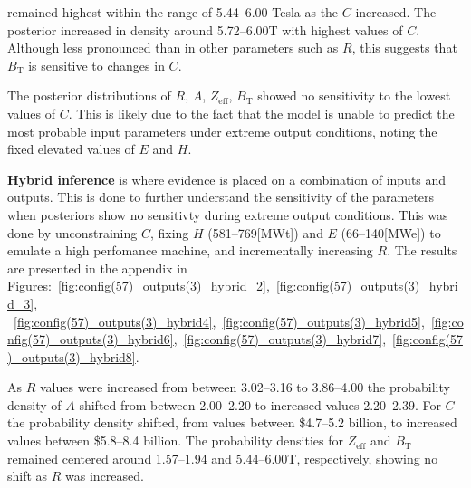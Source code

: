 \documentclass[journal]{IEEEtran}
\begin{document}
 remained highest within the range of 5.44--6.00 Tesla as the $C$ increased. The posterior increased in density around 5.72--6.00T with highest values of $C$. Although less pronounced than in other parameters such as $R$, this suggests that $B_{\text{T}}$ is sensitive to changes in $C$.

The posterior distributions of $R$, $A$, $Z_{\text{eff}}$, $B_{\text{T}}$ showed no sensitivity to the lowest values of $C$. This is likely due to the fact that the model is unable to predict the most probable input parameters under extreme output conditions, noting the fixed elevated values of $E$ and $H$. 

\textbf{Hybrid inference} is where evidence is placed on a combination of inputs and outputs. This is done to further understand the sensitivity of the  parameters when posteriors show no sensitivty during extreme output conditions. This was done by unconstraining $C$, fixing $H$ (581--769[MWt]) and $E$ (66--140[MWe]) to emulate a high perfomance machine, and incrementally increasing $R$. The results are presented in the appendix in Figures:~\ref{fig:config(57)_outputs(3)_hybrid_2},~\ref{fig:config(57)_outputs(3)_hybrid_3},
~\ref{fig:config(57)_outputs(3)_hybrid4},~\ref{fig:config(57)_outputs(3)_hybrid5},~\ref{fig:config(57)_outputs(3)_hybrid6},~\ref{fig:config(57)_outputs(3)_hybrid7},~\ref{fig:config(57)_outputs(3)_hybrid8}.

As $R$ values were increased from between 3.02--3.16 to 3.86--4.00 the probability density of $A$ shifted from between 2.00--2.20 to increased values 2.20--2.39. For $C$ the probability density shifted, from values between \$4.7--5.2 billion, to increased values between \$5.8--8.4 billion. The probability densities for $Z_{\text{eff}}$ and $B_{\text{T}}$ remained centered around 1.57--1.94 and 5.44--6.00T, respectively, showing no shift as $R$ was increased. 


\end{document}
